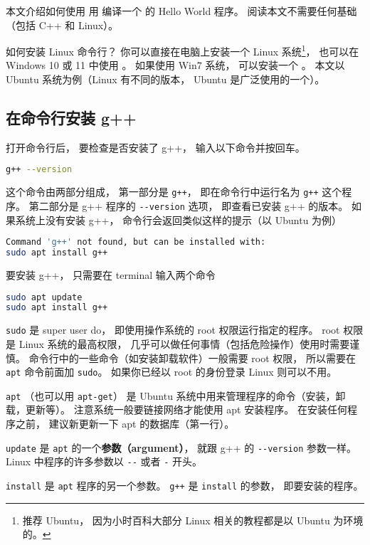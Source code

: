 
本文介绍如何使用 用 编译一个  的 Hello World 程序。 阅读本文不需要任何基础（包括 C++ 和 Linux）。

如何安装 Linux 命令行？ 你可以直接在电脑上安装一个 Linux 系统\footnote{推荐 Ubuntu， 因为小时百科大部分 Linux 相关的教程都是以 Ubuntu 为环境的。}， 也可以在 Windows 10 或 11 中使用 。 如果使用 Win7 系统， 可以安装一个 。 本文以 Ubuntu 系统为例（Linux 有不同的版本， Ubuntu 是广泛使用的一个）。

\subsection{在命令行安装 g++}
打开命令行后， 要检查是否安装了 g++， 输入以下命令并按回车。
\begin{lstlisting}[language=bash]
g++ --version
\end{lstlisting}
这个命令由两部分组成， 第一部分是 \verb|g++|， 即在命令行中运行名为 \verb|g++| 这个程序。 第二部分是 g++ 程序的 \verb|--version| 选项， 即查看已安装 g++ 的版本。 如果系统上没有安装 g++， 命令行会返回类似这样的提示（以 Ubuntu 为例）
\begin{lstlisting}[language=bash]
Command 'g++' not found, but can be installed with:
sudo apt install g++
\end{lstlisting}
要安装 g++， 只需要在 terminal 输入两个命令
\begin{lstlisting}[language=bash]
sudo apt update
sudo apt install g++
\end{lstlisting}
\verb|sudo| 是 super user do， 即使用操作系统的 root 权限运行指定的程序。 root 权限是 Linux 系统的最高权限， 几乎可以做任何事情（包括危险操作）使用时需要谨慎。 命令行中的一些命令（如安装卸载软件）一般需要 root 权限， 所以需要在 \verb|apt| 命令前面加 \verb|sudo|。 如果你已经以 root 的身份登录 Linux 则可以不用。

\verb|apt| （也可以用 \verb|apt-get|） 是 Ubuntu 系统中用来管理程序的命令（安装，卸载，更新等）。 注意系统一般要链接网络才能使用 apt 安装程序。 在安装任何程序之前， 建议新更新一下 apt 的数据库（第一行）。

\verb|update| 是 \verb|apt| 的一个\textbf{参数（argument）}， 就跟 g++ 的 \verb|--version| 参数一样。 Linux 中程序的许多参数以 \verb|--| 或者 \verb|-| 开头。

\verb|install| 是 \verb|apt| 程序的另一个参数。 \verb|g++| 是 \verb|install| 的参数， 即要安装的程序。

